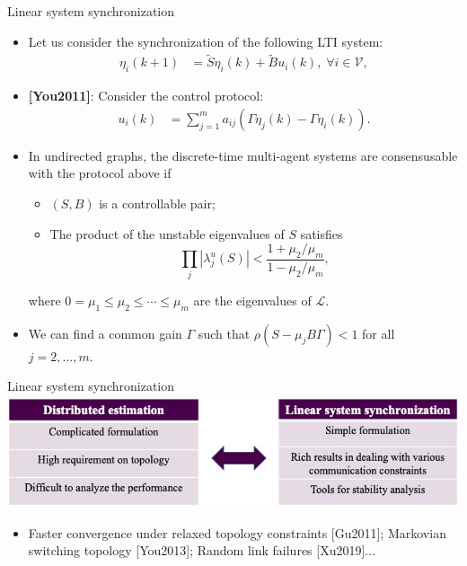 \documentclass[10pt]{beamer}
\DeclareMathOperator{\1}{\textbf{1}}
\begin{document}
\begin{frame}{Linear system synchronization}	

  \begin{itemize}
    \item Let us consider the synchronization of the following LTI system:
      \begin{align}\label{eqn:linear}
	\eta_i(k+1) &= \tilde{S}\eta_i(k) + \tilde{B}u_i(k), \;\forall i\in\mathcal{V},
      \end{align}
 
    \item {\textbf{[You2011]}}: Consider the control protocol:
      \begin{align*}
	u_i(k)&=\sum_{j=1}^m a_{ij}(\Gamma \eta_j(k)-\Gamma \eta_i(k)).
      \end{align*}
    \item In undirected graphs, the discrete-time multi-agent systems are consensusable with the protocol above if
      \begin{itemize}
	\item $(S,B)$ is a controllable pair;
	\item The product of the unstable eigenvalues of $S$ satisfies $$\prod_{j}|\lambda_j^u(S)|<\frac{1+\mu_2/\mu_m}{1-\mu_2/\mu_m},$$
      \end{itemize}
      where $0=\mu_1\leq \mu_2 \leq \cdots \leq \mu_m$ are the eigenvalues of $\mathcal{L}$.
    \item We can find a common gain $\Gamma$ such that $\rho(S-\mu_j B \Gamma)<1$ for all $j=2,...,m.$
  \end{itemize}
\end{frame}

\begin{frame}{Linear system synchronization}
  \includegraphics[width=1\textwidth]{pic/bridge}
  \begin{itemize}
    \item Faster convergence under relaxed topology constraints [Gu2011]; Markovian switching topology [You2013]; Random link failures [Xu2019]...
  \end{itemize}
\end{frame}
\end{document}
